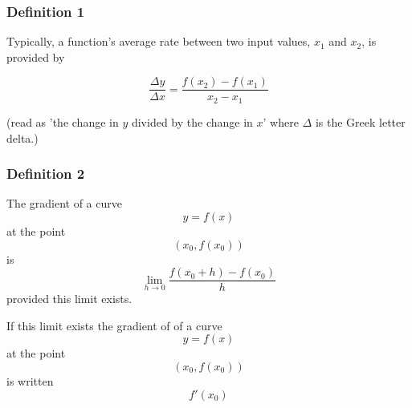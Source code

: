 \documentclass[11pt]{article}
\begin{document}
\subsubsection{Definition 1}
\label{sec:orgd997582}

Typically, a function's average rate between two input values, \(x_1\)
and \(x_2\), is provided by

\[\dfrac{\Delta y}{\Delta x} = \dfrac{f(x_2)-f(x_1)}{x_2-x_1}\]

(read as 'the change in \(y\) divided by the change in \(x\)' where
\(\Delta\) is the Greek letter delta.)


\subsubsection{Definition 2}
\label{sec:orga7f3571}

The gradient of a curve \[y = f(x)\] at the point \[(x_0, f(x_0))\] is
\[ \lim_{h\to 0}\dfrac{f(x_0 + h) - f(x_0)}{h} \]  provided this
limit exists.

If this limit exists the gradient of of a curve \[y = f(x)\] at the
point \[(x_0, f(x_0))\] is written \[f'(x_0)\]
\end{document}
